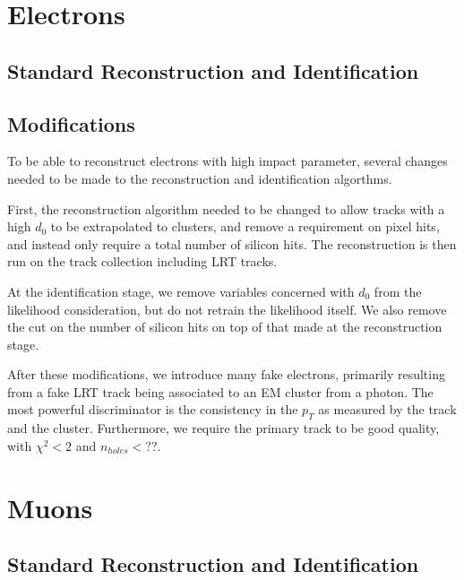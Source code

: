 \section{Electrons}
\label{sec:elecreco}

\subsection{Standard Reconstruction and Identification}
\subsection{Modifications}
To be able to reconstruct electrons with high impact parameter, several changes needed to be made to the reconstruction and identification algorthms. 

First, the reconstruction algorithm needed to be changed to allow tracks with a high $d_{0}$ to be extrapolated to clusters, and remove a requirement on pixel hits, and instead only require a total number of silicon hits. The reconstruction is then run on the track collection including \ac{LRT} tracks. 


At the identification stage, we remove variables concerned with $d_{0}$ from the likelihood consideration, but do not retrain the likelihood itself. We also remove the cut on the number of silicon hits on top of that made at the reconstruction stage. 

After these modifications, we introduce many fake electrons, primarily resulting from a fake \ac{LRT} track being associated to an \ac{EM} cluster from a photon. The most powerful discriminator is the consistency in the $p_{T}$ as measured by the track and the cluster. Furthermore, we require the primary track to be good quality, with $\chi^{2} < 2$ and $n_{holes} < ??$. 




\section{Muons}
\label{sec:muonreco}
\subsection{Standard Reconstruction and Identification}

